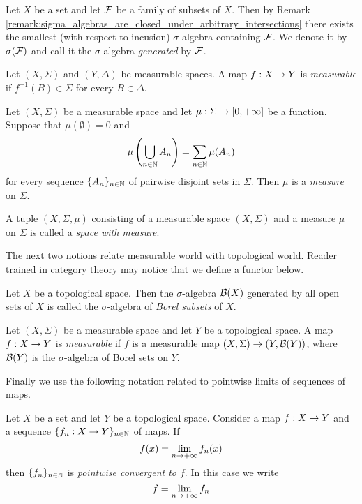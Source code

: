 \documentclass[10pt]{amsart}
\begin{document}
\begin{remark}\label{remark:sigma_algebra_generated_by_family}
	Let $X$ be a set and let ${\mathcal F}$ be a family of subsets of $X$. Then by Remark \ref{remark:sigma_algebras_are_closed_under_arbitrary_intersections} there exists the smallest (with respect to incusion) $\sigma$-algebra containing ${\mathcal F}$. We denote it by $\sigma({\mathcal F})$ and call it the $\sigma$-algebra \textit{generated} by ${\mathcal F}$.
\end{remark}

\begin{definition}
	Let $(X,\Sigma)$ and $(Y,\Delta)$ be measurable spaces. A map $f:X\rightarrow Y$ is \textit{measurable} if $f^{-1}(B)\in \Sigma$ for every $B\in \Delta$.
\end{definition}

\begin{definition}
	Let $(X,\Sigma)$ be a measurable space and let $\mu:\Sigma \rightarrow [0,+\infty]$ be a function. Suppose that $\mu(\emptyset) = 0$ and
	$$\mu\left(\bigcup_{n \in {\mathbb N}}A_n\right) = \sum_{n\in {\mathbb N}}\mu(A_n)$$
	for every sequence $\{A_n\}_{n\in {\mathbb N}}$ of pairwise disjoint sets in $\Sigma$. Then $\mu$ is a \textit{measure} on $\Sigma$.
\end{definition}

\begin{definition}
	A tuple $(X,\Sigma,\mu)$ consisting of a measurable space $\left(X,\Sigma\right)$ and a measure $\mu$ on $\Sigma$ is called a \textit{space with measure}.
\end{definition}
\noindent
The next two notions relate measurable world with topological world. Reader trained in category theory may notice that we define a functor below.

\begin{definition}
	Let $X$ be a topological space. Then the $\sigma$-algebra ${\mathcal B}(X)$ generated by all open sets of $X$ is called the $\sigma$-algebra of \textit{Borel subsets} of $X$.
\end{definition}

\begin{definition}
	Let $(X,\Sigma)$ be a measurable space and let $Y$ be a topological space. A map $f:X\rightarrow Y$ is \textit{measurable} if $f$ is a measurable map $(X,\Sigma)\rightarrow (Y,{\mathcal B}(Y))$, where ${\mathcal B}(Y)$ is the $\sigma$-algebra of Borel sets on $Y$.
\end{definition}
\noindent
Finally we use the following notation related to pointwise limits of sequences of maps.

\begin{definition}
	Let $X$ be a set and let $Y$ be a topological space. Consider a map $f:X\rightarrow Y$ and a sequence $\{f_n:X\rightarrow Y\}_{n\in {\mathbb N}}$ of maps. If
	$$f(x) = \lim_{n\rightarrow +\infty}f_n(x)$$
	then $\{f_n\}_{n\in {\mathbb N}}$ is \textit{pointwise convergent to $f$}. In this case we write
	$$f = \lim_{n\rightarrow +\infty}f_n$$
\end{definition}
\end{document}
